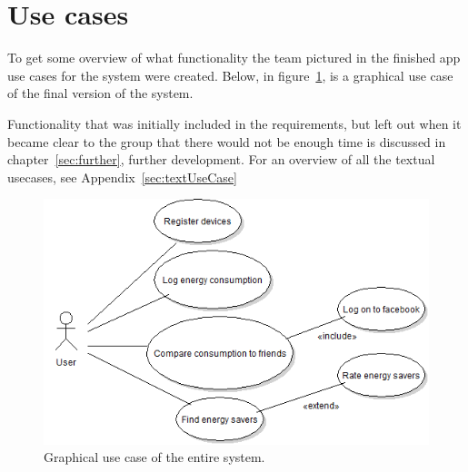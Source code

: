 \section{Use cases}
To get some overview of what functionality the team pictured in the finished app \glspl{use case} for the system were created. Below, in figure~\ref{fig:usecase}, is a graphical use case of the final version of the system.

Functionality that was initially included in the requirements, but left out when it became clear to the group that there would not be enough time is discussed in chapter~\ref{sec:further}, further development. For an overview of all the textual usecases, see Appendix~\ref{sec:textUseCase} \newline

\begin{figure}[H]
\includegraphics[width=\textwidth]{ch/specification/fig/currentUsecase.png}
\caption{Graphical use case of the entire system.}
\label{fig:usecase}
\end{figure}
